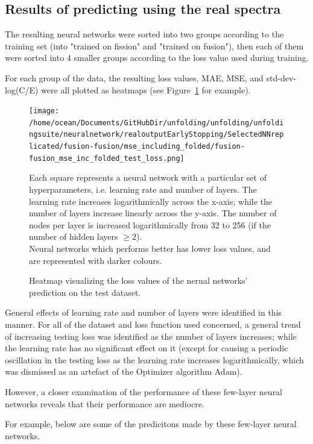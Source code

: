 \documentclass[a4paper, 12pt]{article}
\begin{document}
\subsection{Results of predicting using the real spectra}
The resulting neural networks were sorted into two groups according to the training set (into "trained on fission" and "trained on fusion"), then each of them were sorted into 4 smaller groups according to the loss value used during training.

For each group of the data, the resulting loss values, MAE, MSE, and std-dev-log(C/E) were all plotted as heatmaps (see Figure~\ref{hyperparametersearchTestLoss} for example).

\begin{figure}
\centering
\texttt{[image: /home/ocean/Documents/GitHubDir/unfolding/unfolding/unfoldingsuite/neuralnetwork/realoutputEarlyStopping/SelectedNNreplicated/fusion-fusion/mse\_including\_folded/fusion-fusion\_mse\_inc\_folded\_test\_loss.png]}
\caption{Heatmap visualizing the loss values of the nerual networks' prediction on the test dataset.}\label{hyperparametersearchTestLoss}
Each square represents a neural network with a particular set of hyperparameters, i.e. learning rate and number of layers. The learning rate increases logarithmically across the x-axis; while the number of layers increase linearly across the y-axis. The number of nodes per layer is increased logarithmically from 32 to 256 (if the number of hidden layers $\ge 2$).\\
Neural networks which performs better has lower loss values, and are represented with darker colours.\\
\end{figure}

General effects of learning rate and number of layers were identified in this manner. For all of the dataset and loss function used concerned, a general trend of increasing testing loss was identified as the number of layers increases; while the learning rate has no significant effect on it (except for causing a periodic oscillation in the testing loss as the learning rate increases logarithmically, which was dismissed as an artefact of the Optimizer algorithm Adam).

However, a closer examination of the performance of these few-layer neural networks reveals that their performance are mediocre. 

For example, below are some of the predicitons made by these few-layer neural networks.
\end{document}
